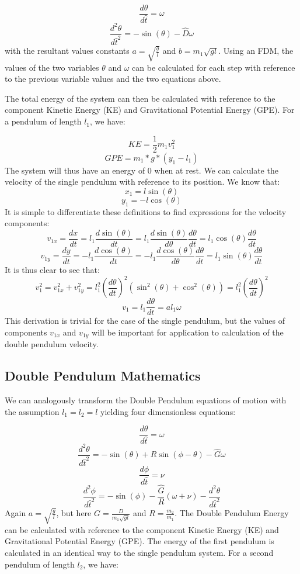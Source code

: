 \documentclass{article}
\begin{document}
\[ \frac{d\theta}{d\hat{t}} = \omega \]
\[ \frac{d^{2}\theta}{d\hat{t}^{2}} = -\sin(\theta) - \hat{D} \omega \]
with the resultant values constants $a = \sqrt{\frac{g}{l}}$ and $b =m_{1}\sqrt{gl}$. Using an FDM, the values of the two variables $\theta$ and $\omega$ can be calculated for each step with reference to the previous variable values and the two equations above. 

The total energy of the system can then be calculated with reference to the component Kinetic Energy (KE) and Gravitational Potential Energy (GPE). For a pendulum of length $l_{1}$, we have:

\[ KE = \frac{1}{2}m_{1} v_{1}^{2} \]
\[ GPE = m_{1} * g * (y_{1} - l_{1}) \]
The system will thus have an energy of 0 when at rest. We can calculate the velocity of the single pendulum with reference to its position. We know that:
\[ x_{1} = l \sin(\theta) \]
\[ y_{1} = -l \cos(\theta) \]
It is simple to differentiate these definitions to find expressions for the velocity components:
\[ v_{1x} = \frac{dx}{dt} = l_{1} \frac{d\sin(\theta)}{dt} = l_{1} \frac{d\sin(\theta)}{d\theta} \frac{d\theta}{dt} = l_{1} \cos(\theta) \frac{d\theta}{dt}\]
\[ v_{1y} = \frac{dy}{dt} = -l_{1} \frac{d\cos(\theta)}{dt} = -l_{1} \frac{d\cos(\theta)}{d\theta} \frac{d\theta}{dt} = l_{1} \sin(\theta) \frac{d\theta}{dt}\]
It is thus clear to see that:
\[ v_{1}^2 = v_{1x}^2 + v_{1y}^2 = l_{1}^2 (\frac{d\theta}{dt})^2(\sin^2(\theta) + \cos^2(\theta)) = l_{1}^2 (\frac{d\theta}{dt})^2\]
\[ v_{1} = l_{1} \frac{d\theta}{dt} = a l_{1} \omega \]
This derivation is trivial for the case of the single pendulum, but the values of components $v_{1x}$ and $v_{1y}$ will be important for application to calculation of the double pendulum velocity.

\subsection{Double Pendulum Mathematics}
We can analogously transform the Double Pendulum equations of motion with the assumption $l_{1}=l_{2}=l$ yielding four dimensionless equations:

\[ \frac{d\theta}{d\hat{t}} = \omega \]
\[ \frac{d^{2}\theta}{d\hat{t}^{2}} = - \sin(\theta) + R\sin(\phi-\theta)- \hat{G} \omega \]
\[ \frac{d\phi}{d\hat{t}} = \nu \]
\[ \frac{d^{2}\phi}{d\hat{t}^{2}} = -\sin(\phi) - \frac{\hat{G}}{R} (\omega + \nu) - \frac{d^{2}\theta}{d\hat{t}^{2}}\]
Again $a = \sqrt{\frac{g}{l}}$, but here $G =\frac{D}{m_{1}\sqrt{gl}}$ and $R=\frac{m_{2}}{m_{1}}$.
The Double Pendulum Energy can be calculated with reference to the component Kinetic Energy (KE) and Gravitational Potential Energy (GPE). The energy of the first pendulum is calculated in an identical way to the single pendulum system. For a second pendulum of length $l_{2}$, we have:
\end{document}
